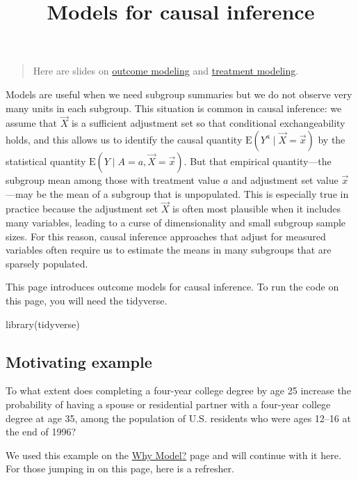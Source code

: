 \documentclass[
  letterpaper,
  DIV=11,
  numbers=noendperiod]{scrartcl}
\title{Models for causal inference}
\author{}
\date{}
\newenvironment{Shaded}{\begin{snugshade}}{\end{snugshade}}
\newcommand{\FunctionTok}[1]{\textcolor[rgb]{0.28,0.35,0.67}{#1}}
\newcommand{\NormalTok}[1]{\textcolor[rgb]{0.00,0.23,0.31}{#1}}
\begin{document}
\maketitle


\begin{quote}
Here are slides on
\href{../slides/lec12_causal_outcome_model/lec12_causal_outcome_model.pdf}{outcome
modeling} and \href{../slides/ipw/ipw.pdf}{treatment modeling}.
\end{quote}

Models are useful when we need subgroup summaries but we do not observe
very many units in each subgroup. This situation is common in causal
inference: we assume that \(\vec{X}\) is a sufficient adjustment set so
that conditional exchangeability holds, and this allows us to identify
the causal quantity \(\text{E}(Y^a\mid \vec{X} = \vec{x})\) by the
statistical quantity \(\text{E}(Y\mid A = a, \vec{X} = \vec{x})\). But
that empirical quantity---the subgroup mean among those with treatment
value \(a\) and adjustment set value \(\vec{x}\)---may be the mean of a
subgroup that is unpopulated. This is especially true in practice
because the adjustment set \(\vec{X}\) is often most plausible when it
includes many variables, leading to a curse of dimensionality and small
subgroup sample sizes. For this reason, causal inference approaches that
adjust for measured variables often require us to estimate the means in
many subgroups that are sparsely populated.

This page introduces outcome models for causal inference. To run the
code on this page, you will need the tidyverse.

\begin{Shaded}
\begin{Highlighting}[]
\FunctionTok{library}\NormalTok{(tidyverse)}
\end{Highlighting}
\end{Shaded}

\subsection{Motivating example}\label{motivating-example}

To what extent does completing a four-year college degree by age 25
increase the probability of having a spouse or residential partner with
a four-year college degree at age 35, among the population of U.S.
residents who were ages 12--16 at the end of 1996?

We used this example on the \href{why_model.qmd}{Why Model?} page and
will continue with it here. For those jumping in on this page, here is a
refresher.
\end{document}
